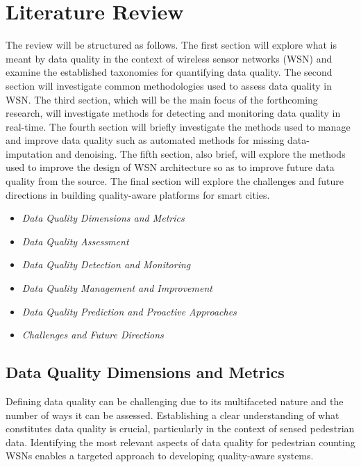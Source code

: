 \section{Literature Review}

The review will be structured as follows. The first section will explore what is meant by data quality in the context of wireless sensor networks (WSN) and examine the established taxonomies for quantifying data quality. The second section will investigate common methodologies used to assess data quality in WSN. The third section, which will be the main focus of the forthcoming research, will investigate methods for detecting and monitoring data quality in real-time. The fourth section will briefly investigate the methods used to manage and improve data quality such as automated methods for missing data-imputation and denoising. The fifth section, also brief, will explore the methods used to improve the design of WSN architecture so as to improve future data quality from the source. The final section will explore the challenges and future directions in building quality-aware platforms for smart cities.

\begin{itemize}
    \setlength{\itemindent}{3cm}
    \raggedright
    \item[\ref{ssec:data_quality_dimensions}] \textit{Data Quality Dimensions and Metrics}
    \item[\ref{ssec:data_quality_assessment}] \textit{Data Quality Assessment}
    \item[\ref{ssec:data_quality_detection}] \textit{Data Quality Detection and Monitoring}
    \item[\ref{ssec:data_quality_management}] \textit{Data Quality Management and Improvement}
    \item[\ref{ssec:data_quality_prediction}] \textit{Data Quality Prediction and Proactive Approaches}
    \item[\ref{ssec:challenges_and_future_directions}] \textit{Challenges and Future Directions}
\end{itemize}

\subsection{Data Quality Dimensions and Metrics} \label{ssec:data_quality_dimensions}

Defining data quality can be challenging due to its multifaceted nature and the number of ways it can be assessed. Establishing a clear understanding of what constitutes data quality is crucial, particularly in the context of sensed pedestrian data. Identifying the most relevant aspects of data quality for pedestrian counting WSNs enables a targeted approach to developing quality-aware systems.


